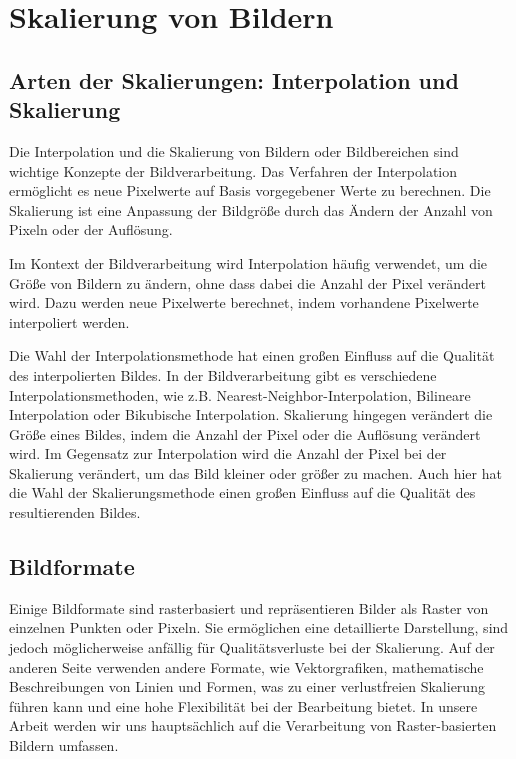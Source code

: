 \section{Skalierung von Bildern}

\subsection{Arten der Skalierungen: Interpolation und Skalierung}
    Die Interpolation und die Skalierung von Bildern oder Bildbereichen sind wichtige Konzepte der Bildverarbeitung. 
    Das Verfahren der Interpolation ermöglicht es neue Pixelwerte auf Basis vorgegebener Werte zu berechnen.
    Die Skalierung ist eine Anpassung der Bildgröße durch das Ändern der Anzahl von Pixeln oder der Auflösung. 
    
    Im Kontext der Bildverarbeitung wird Interpolation häufig verwendet, um die Größe von Bildern zu ändern, ohne dass dabei die Anzahl der Pixel verändert wird. Dazu werden neue Pixelwerte berechnet, indem vorhandene Pixelwerte interpoliert werden. 
    
    Die Wahl der Interpolationsmethode hat einen großen Einfluss auf die Qualität des interpolierten Bildes. 
    In der Bildverarbeitung gibt es verschiedene Interpolationsmethoden, wie z.B. Nearest-Neighbor-Interpolation, Bilineare Interpolation oder Bikubische Interpolation.
    Skalierung hingegen verändert die Größe eines Bildes, indem die Anzahl der Pixel oder die Auflösung verändert wird. 
    Im Gegensatz zur Interpolation wird die Anzahl der Pixel bei der Skalierung verändert, um das Bild kleiner oder größer zu machen. 
    Auch hier hat die Wahl der Skalierungsmethode einen großen Einfluss auf die Qualität des resultierenden Bildes.

\subsection{Bildformate}
    Einige Bildformate sind rasterbasiert und repräsentieren Bilder als Raster von einzelnen Punkten oder Pixeln. Sie ermöglichen eine detaillierte Darstellung, sind jedoch möglicherweise anfällig für Qualitätsverluste bei der Skalierung. Auf der anderen Seite verwenden andere Formate, wie Vektorgrafiken, mathematische Beschreibungen von Linien und Formen, was zu einer verlustfreien Skalierung führen kann und eine hohe Flexibilität bei der Bearbeitung bietet.
    In unsere Arbeit werden wir uns hauptsächlich auf die Verarbeitung von Raster-basierten Bildern umfassen.
    
